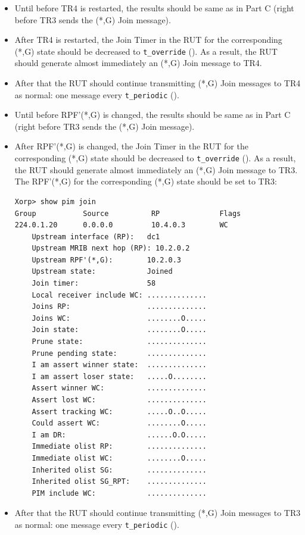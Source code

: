 \documentclass[11pt]{report}
\begin{document}
\begin{itemize}

  \item Until before TR4 is restarted, the results should
  be same as in Part C (right before TR3 sends the (*,G) Join message).

  \item After TR4 is restarted,
  the Join Timer in the RUT for the corresponding (*,G) state
  should be decreased to \verb=t_override= ({\PimsmTOverride}). As a result,
  the RUT should generate almost immediately an (*,G) Join message to TR4.

  \item After that the RUT should continue transmitting 
  (*,G) Join messages to TR4 as normal: one message every \verb=t_periodic=
  ({\PimsmTPeriodic}).

\end{itemize}


\begin{itemize}

  \item Until before RPF'(*,G) is changed, the results should
  be same as in Part C (right before TR3 sends the (*,G) Join message).

  \item After RPF'(*,G) is changed,
  the Join Timer in the RUT for the corresponding (*,G) state
  should be decreased to \verb=t_override= ({\PimsmTOverride}). As a result,
  the RUT should generate almost immediately an (*,G) Join message to TR3.
  The RPF'(*,G) for the corresponding (*,G) state should be set to TR3:

\begin{verbatim}
Xorp> show pim join
Group           Source          RP              Flags
224.0.1.20      0.0.0.0         10.4.0.3        WC   
    Upstream interface (RP):   dc1
    Upstream MRIB next hop (RP): 10.2.0.2
    Upstream RPF'(*,G):        10.2.0.3
    Upstream state:            Joined 
    Join timer:                58
    Local receiver include WC: ..............
    Joins RP:                  ..............
    Joins WC:                  ........O.....
    Join state:                ........O.....
    Prune state:               ..............
    Prune pending state:       ..............
    I am assert winner state:  ..............
    I am assert loser state:   .....O........
    Assert winner WC:          ..............
    Assert lost WC:            ..............
    Assert tracking WC:        .....O..O.....
    Could assert WC:           ........O.....
    I am DR:                   ......O.O.....
    Immediate olist RP:        ..............
    Immediate olist WC:        ........O.....
    Inherited olist SG:        ..............
    Inherited olist SG_RPT:    ..............
    PIM include WC:            ..............
\end{verbatim}

  \item After that the RUT should continue transmitting 
  (*,G) Join messages to TR3 as normal: one message every \verb=t_periodic=
  ({\PimsmTPeriodic}).

\end{itemize}
\end{document}
